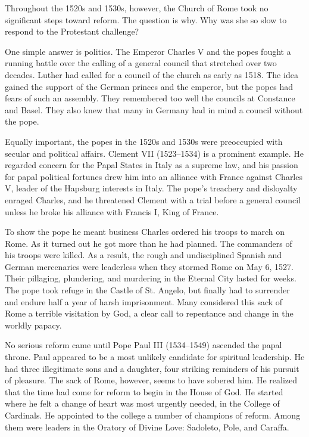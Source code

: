 Throughout the 1520s and 1530s, however, the Church of Rome took no significant steps toward reform.
The question is why. Why was she so slow to respond to the Protestant challenge?

One simple answer is politics. The Emperor Charles V and the popes fought a running battle over the
calling of a general council that stretched over two decades. Luther had called for a council of the
church as early as 1518. The idea gained the support of the German princes and the emperor, but the
popes had fears of such an assembly. They remembered too well the councils at Constance and Basel.
They also knew that many in Germany had in mind a council without the pope.

Equally important, the popes in the 1520s and 1530s were preoccupied with secular and political
affairs. Clement VII (1523–1534) is a prominent example. He regarded concern for the Papal States in
Italy as a supreme law, and his passion for papal political fortunes drew him into an alliance with
France against Charles V, leader of the Hapsburg interests in Italy. The pope’s treachery and
disloyalty enraged Charles, and he threatened Clement with a trial before a general council unless
he broke his alliance with Francis I, King of France.

To show the pope he meant business Charles ordered his troops to march on Rome. As it turned out he
got more than he had planned. The commanders of his troops were killed. As a result, the rough and
undisciplined Spanish and German mercenaries were leaderless when they stormed Rome on May 6, 1527.
Their pillaging, plundering, and murdering in the Eternal City lasted for weeks. The pope took
refuge in the Castle of St. Angelo, but finally had to surrender and endure half a year of harsh
imprisonment. Many considered this sack of Rome a terrible visitation by God, a clear call to
repentance and change in the worldly papacy.

No serious reform came until Pope Paul III (1534–1549) ascended the papal throne. Paul appeared to
be a most unlikely candidate for spiritual leadership. He had three illegitimate sons and a
daughter, four striking reminders of his pursuit of pleasure. The sack of Rome, however, seems to
have sobered him. He realized that the time had come for reform to begin in the House of God. He
started where he felt a change of heart was most urgently needed, in the College of Cardinals. He
appointed to the college a number of champions of reform. Among them were leaders in the Oratory of
Divine Love: Sadoleto, Pole, and Caraffa.

